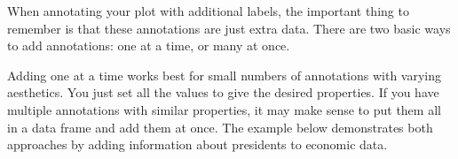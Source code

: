 
When annotating your plot with additional labels, the important thing to
remember is that these annotations are just extra data. There are two
basic ways to add annotations: one at a time, or many at once.

Adding one at a time works best for small numbers of annotations with
varying aesthetics. You just set all the values to give the desired
properties. If you have multiple annotations with similar properties, it
may make sense to put them all in a data frame and add them at once. The
example below demonstrates both approaches by adding information about
presidents to economic data.

